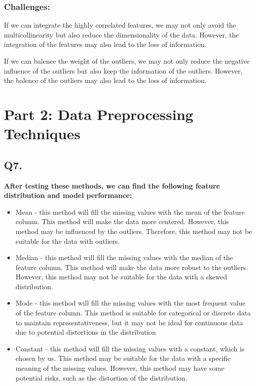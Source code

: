 \documentclass{article}
\begin{document}
\subsubsection*{Challenges:}

If we can integrate the highly correlated features, we may not only avoid the multicollinearity but also reduce the dimensionality of the data. However, the integration of the features may also lead to the loss of information.

If we can balence the weight of the outliers, we may not only reduce the negative influence of the outliers but also keep the information of the outliers. However, the balence of the outliers may also lead to the loss of information.

\newpage

\section*{Part 2:  Data Preprocessing Techniques}

\subsection*{Q7.}

\textbf{After testing these methods, we can find the following feature distribution and model performance:}

\begin{itemize}
    \item Mean - this method will fill the missing values with the mean of the feature column. This method will make the data more centered. However, this method may be influenced by the outliers. Therefore, this method may not be suitable for the data with outliers.
    \item Median - this method will fill the missing values with the median of the feature column. This method will make the data more robust to the outliers. However, this method may not be suitable for the data with a skewed distribution.
    \item Mode - this method will fill the missing values with the most frequent value of the feature column. This method is suitable for categorical or discrete data to maintain representativeness, but it may not be ideal for continuous data due to potential distortions in the distribution
    \item Constant - this method will fill the missing values with a constant, which is chosen by us. This method may be suitable for the data with a specific meaning of the missing values. However, this method may have some potential risks, such as the distortion of the distribution.
\end{itemize}
\end{document}
